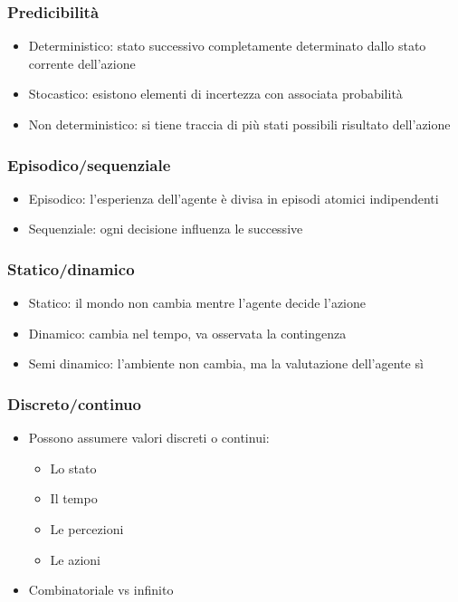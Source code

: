 \documentclass{article}
\begin{document}
\subsubsection{Predicibilità}
\begin{itemize}
    \item Deterministico: stato successivo completamente determinato dallo stato corrente dell'azione
    \item Stocastico: esistono elementi di incertezza con associata probabilità
    \item Non deterministico: si tiene traccia di più stati possibili risultato dell'azione
\end{itemize}
\subsubsection{Episodico/sequenziale}
\begin{itemize}
    \item Episodico: l'esperienza dell'agente è divisa in episodi atomici indipendenti
    \item Sequenziale: ogni decisione influenza le successive
\end{itemize}
\subsubsection{Statico/dinamico}
\begin{itemize}
    \item Statico: il mondo non cambia mentre l'agente decide l'azione
    \item Dinamico: cambia nel tempo, va osservata la contingenza
    \item Semi dinamico: l'ambiente non cambia, ma la valutazione dell'agente sì
\end{itemize}
\subsubsection{Discreto/continuo}
\begin{itemize}
    \item Possono assumere valori discreti o continui:
    \begin{itemize}
        \item Lo stato
        \item Il tempo
        \item Le percezioni
        \item Le azioni
    \end{itemize}
    \item Combinatoriale vs infinito
\end{itemize}
\end{document}
